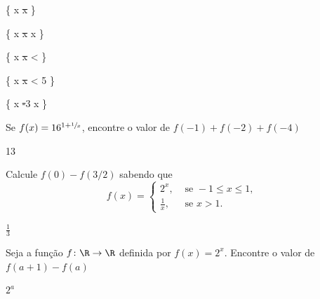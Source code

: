 \begin{exercises*}
\begin{exercise}
  \begin{answer}
    \begin{mathlist}
      \item \left\{ x \in \R \st x \geq {}            \right\}
      \item \left\{ x \in \R \st x   x \right\}
      \item \left\{ x \in \R \st x <                \right\}
      \item \left\{ x \in \R \st x < 5                         \right\}
      \item \left\{ x \in \R \st -3 \leq x               \right\}
    \end{mathlist}
  \end{answer}
\end{exercise}

\begin{exercise}
  Se \(f(x) = 16^{1+\sfrac{1}{x}}\),
  encontre o valor de $f(-1) + f(-2) + f(-4)$

  \begin{answer}
    13
  \end{answer}
\end{exercise}

\begin{exercise}
  Calcule $f(0)-f (3/2)$ sabendo que
  \[
    f(x) = \begin{cases}
      2^x,         & \text{ se } -1 \leq x \leq 1, \\
      \frac{1}{x}, & \text{ se } x > 1.
    \end{cases}
  \]

  \begin{answer}
    \(\frac{1}{3}\)
  \end{answer}
\end{exercise}

\begin{exercise}
  Seja a função $f\colon \R\to\R$ definida por $f(x) = 2^x$.
  Encontre o valor de $f(a+1)-f(a)$

  \begin{answer}
    $2^a$
  \end{answer}
\end{exercise}

\end{exercises*}

